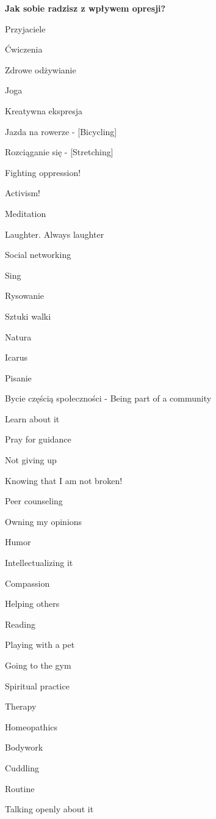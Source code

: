 \noindent\textcolor{ProcessBlue}{\textbf{\Large{Jak sobie radzisz z wpływem opresji?}}}\\
\begin{multicols}{2}
\begin{checkboxlist}
\item Przyjaciele
\item Ćwiczenia
\item Zdrowe odżywianie
\item Joga
\item Kreatywna ekspresja
\item Jazda na rowerze - [Bicycling]
\item Rozciąganie się - [Stretching]
\item Fighting oppression!
\item Activism!
\item Meditation
\item Laughter. Always laughter
\item Social networking
\item Sing
\item Rysowanie
\item Sztuki walki
\item Natura
\item Icarus
\item Pisanie
\item Bycie częścią społeczności - Being part of a community
\item Learn about it
\item Pray for guidance
\item Not giving up
\item Knowing that I am not broken!
\item Peer counseling
\item Owning my opinions
\item Humor
\item Intellectualizing it
\item Compassion
\item Helping others
\item Reading
\item Playing with a pet
\item Going to the gym
\item Spiritual practice
\item Therapy
\item Homeopathics
\item Bodywork
\item Cuddling
\item Routine
\item Talking openly about it

\end{checkboxlist}
\end{multicols}
